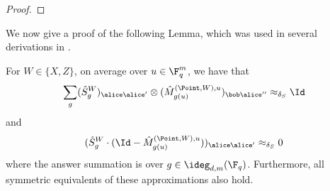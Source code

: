 \begin{proof}
		

\end{proof}


We now give a proof of the following Lemma, which was used in several derivations in . 
\begin{lemma}
\label{lem:qld-constructing-the-paulis-helper}
	For $W \in \{X,Z\}$, on average over $u \in \F_q^m$, we have that
	\begin{gather}
		\label{eq:qld-sg-cons}
		\sum_g (\hat{S}^W_g)_{\alice \alice'} \otimes (\hat{M}^{(\Point,W),u}_{g(u)})_{\bob \alice''} \approx_{\delta_S} \Id
	\end{gather}
	and
	\begin{gather}
		\label{eq:qld-sg-cons2}
		(\hat{S}^W_g \cdot (\Id - \hat{M}^{(\Point, W), u}_{g(u)}))_{\alice \alice'} \approx_{\delta_S} 0
	\end{gather}
	where the answer summation is over $g \in \ideg_{d,m}(\F_q)$.
      Furthermore, all symmetric equivalents of these approximations
      also hold.
\end{lemma}
